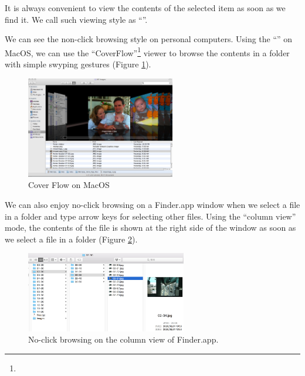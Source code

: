 \documentclass[conference]{IEEEtran}
\begin{document}
It is always convenient to view the contents of the selected item
as soon as we find it.
We call such viewing style as ``''.

We can see the non-click browsing style on personal computers.
Using the ``'' on MacOS, we can use the ``CoverFlow''\footnote{
} viewer to browse the contents in a folder
with simple swyping gestures (Figure \ref{coverflow}).

\begin{figure}[H]
\centerline{\includegraphics[width=65mm,bb=0 0 1080 740]{figures/902678c6770b5e043baa6f503375749f.jpg}}
\caption{Cover Flow on MacOS}
\label{coverflow}
\end{figure}

We can also enjoy no-click browsing on a Finder.app window
when we select a file in a folder and
type arrow keys for selecting other files.
Using the ``column view'' mode, 
the contents of the file is shown at the right side of the window
as soon as we select a file in a folder (Figure \ref{noclickfinder}).

\begin{figure}[H]
\centerline{\includegraphics[width=70mm,bb=0 0 839 423]{figures/10d7ca6c55aa93ebcdab799246e4c087.jpg}}
\caption{No-click browsing on the column view of Finder.app.}
\label{noclickfinder}
\end{figure}


\end{document}
